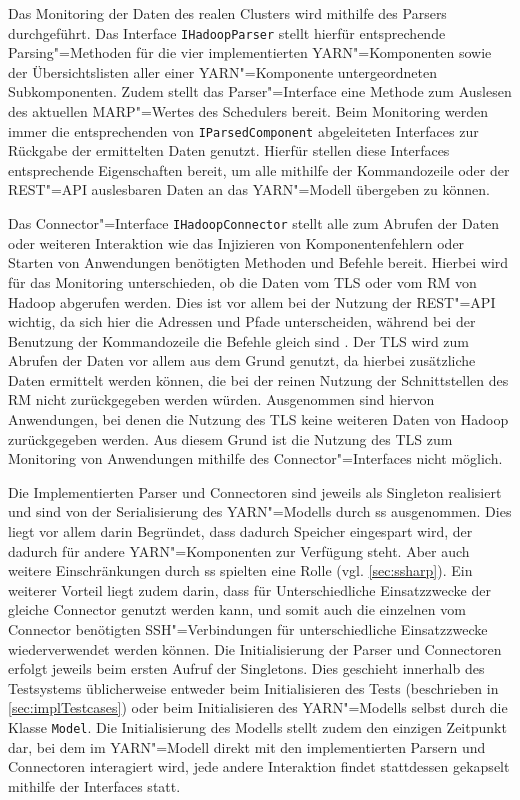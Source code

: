 Das Monitoring der Daten des realen Clusters wird mithilfe des Parsers durchgeführt.
Das Interface \texttt{IHadoopParser} stellt hierfür entsprechende Parsing"=Methoden für die vier implementierten YARN"=Komponenten sowie der Übersichtslisten aller einer YARN"=Komponente untergeordneten Subkomponenten.
Zudem stellt das Parser"=Interface eine Methode zum Auslesen des aktuellen \ac{MARP}"=Wertes des Schedulers bereit.
Beim Monitoring werden immer die entsprechenden von \texttt{IParsedComponent} abgeleiteten Interfaces zur Rückgabe der ermittelten Daten genutzt.
Hierfür stellen diese Interfaces entsprechende Eigenschaften bereit, um alle mithilfe der Kommandozeile oder der REST"=API auslesbaren Daten an das YARN"=Modell übergeben zu können.

Das Connector"=Interface \texttt{IHadoopConnector} stellt alle zum Abrufen der Daten oder weiteren Interaktion wie das Injizieren von Komponentenfehlern oder Starten von Anwendungen benötigten Methoden und Befehle bereit.
Hierbei wird für das Monitoring unterschieden, ob die Daten vom \ac{TLS} oder vom \ac{RM} von Hadoop abgerufen werden.
Dies ist vor allem bei der Nutzung der REST"=API wichtig, da sich hier die Adressen und Pfade unterscheiden, während bei der Benutzung der Kommandozeile die Befehle gleich sind .
Der \ac{TLS} wird zum Abrufen der Daten vor allem aus dem Grund genutzt, da hierbei zusätzliche Daten ermittelt werden können, die bei der reinen Nutzung der Schnittstellen des \ac{RM} nicht zurückgegeben werden würden.
Ausgenommen sind hiervon Anwendungen, bei denen die Nutzung des \ac{TLS} keine weiteren Daten von Hadoop zurückgegeben werden\cite{HadoopYarnTlServer271,HadoopYarnCmds271,HadoopRmApi271,HadoopNmApi271}.
Aus diesem Grund ist die Nutzung des \ac{TLS} zum Monitoring von Anwendungen mithilfe des Connector"=Interfaces nicht möglich.

Die Implementierten Parser und Connectoren sind jeweils als Singleton realisiert und sind von der Serialisierung des YARN"=Modells durch \ac{ss} ausgenommen.
Dies liegt vor allem darin Begründet, dass dadurch Speicher eingespart wird, der dadurch für andere YARN"=Komponenten zur Verfügung steht.
Aber auch weitere Einschränkungen durch \ac{ss} spielten eine Rolle (vgl. \cref{sec:ssharp}).
Ein weiterer Vorteil liegt zudem darin, dass für Unterschiedliche Einsatzzwecke der gleiche Connector genutzt werden kann, und somit auch die einzelnen vom Connector benötigten SSH"=Verbindungen für unterschiedliche Einsatzzwecke wiederverwendet werden können.
Die Initialisierung der Parser und Connectoren erfolgt jeweils beim ersten Aufruf der Singletons.
Dies geschieht innerhalb des Testsystems üblicherweise entweder beim Initialisieren des Tests (beschrieben in \cref{sec:implTestcases}) oder beim Initialisieren des YARN"=Modells selbst durch die Klasse \texttt{Model}.
Die Initialisierung des Modells stellt zudem den einzigen Zeitpunkt dar, bei dem im YARN"=Modell direkt mit den implementierten Parsern und Connectoren interagiert wird, jede andere Interaktion findet stattdessen gekapselt mithilfe der Interfaces statt.

